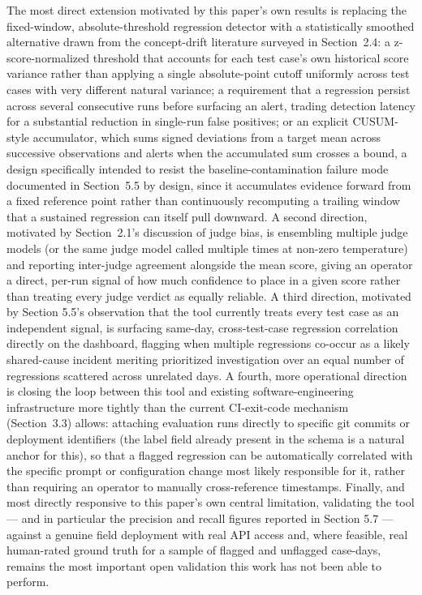 \documentclass[11pt,a4paper]{article}
\begin{document}
The most direct extension motivated by this paper's own
results is replacing the fixed-window, absolute-threshold regression
detector with a statistically smoothed alternative drawn from the
concept-drift literature surveyed in Section~2.4: a z-score-normalized
threshold that accounts for each test case's own
historical score variance rather than applying a single absolute-point
cutoff uniformly across test cases with very different natural variance;
a requirement that a regression persist across several consecutive runs
before surfacing an alert, trading detection latency for a substantial
reduction in single-run false positives; or an explicit CUSUM-style
accumulator, which sums signed deviations from a target mean across
successive observations and alerts when the accumulated sum crosses a
bound, a design specifically intended to resist the
baseline-contamination failure mode documented in Section~5.5 by design,
since it accumulates evidence forward from a fixed reference point
rather than continuously recomputing a trailing window that a sustained
regression can itself pull downward. A second direction, motivated by
Section~2.1's discussion of judge bias, is ensembling
multiple judge models (or the same judge model called multiple times at
non-zero temperature) and reporting inter-judge agreement alongside the
mean score, giving an operator a direct, per-run signal of how much
confidence to place in a given score rather than treating every judge
verdict as equally reliable. A third direction, motivated by Section
5.5's observation that the tool currently treats every
test case as an independent signal, is surfacing same-day,
cross-test-case regression correlation directly on the dashboard,
flagging when multiple regressions co-occur as a likely shared-cause
incident meriting prioritized investigation over an equal number of
regressions scattered across unrelated days. A fourth, more operational
direction is closing the loop between this tool and existing
software-engineering infrastructure more tightly than the current
CI-exit-code mechanism (Section~3.3) allows: attaching evaluation runs
directly to specific git commits or deployment identifiers (the label
field already present in the schema is a natural anchor for this), so
that a flagged regression can be automatically correlated with the
specific prompt or configuration change most likely responsible for it,
rather than requiring an operator to manually cross-reference
timestamps. Finally, and most directly responsive to this
paper's own central limitation, validating the tool ---
and in particular the precision and recall figures reported in Section
5.7 --- against a genuine field deployment with real API access and,
where feasible, real human-rated ground truth for a sample of flagged
and unflagged case-days, remains the most important open validation this
work has not been able to perform.
\end{document}
